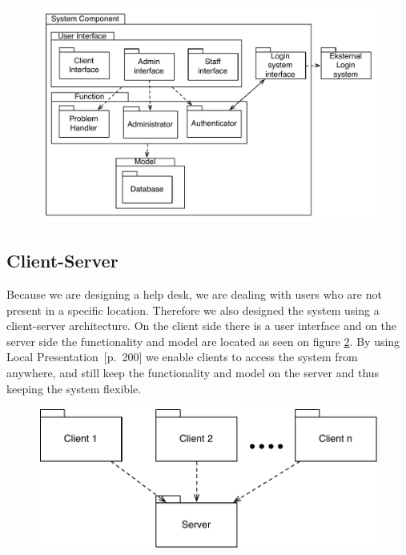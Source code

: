 \begin{figure}[]
	\centering
	\includegraphics[scale=0.5]{input/architectural_design/system_component_denalternative.pdf}
	\morscaption{}
	\label{fig:AltSystemComponent}
\end{figure}


\subsection{Client-Server}
Because we are designing a help desk, we are dealing with users who are not present in a specific location. Therefore we also designed the system using a client-server architecture.
On the client side there is a user interface and on the server side the functionality and model are located as seen on figure \ref{fig:client-server}. By using Local Presentation~\cite{roedeaalborg}[p.~200] we enable clients to access the system from anywhere, and still keep the functionality and model on the server and thus keeping the system flexible.         


\begin{figure}%
	\includegraphics[scale=0.5]{input/architectural_design/client-server-architecture-pattern.pdf}%
	\morscaption{}
	\label{fig:client-server}%
\end{figure}